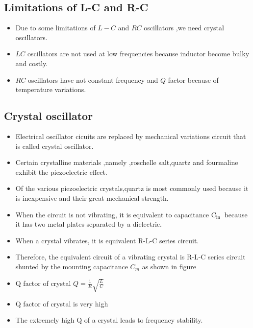 \subsection{Limitations of L-C and R-C}
\begin{itemize}
	\item Due to some limitations of $L-C$ and $RC$ oscillators ,we need crystal oscillators.
	\item $LC$ oscillators are not used at low frequencies because inductor become bulky and costly.
	\item $RC$ oscillators have not constant frequency and $Q$ factor because of temperature variations.
\end{itemize}
\subsection{Crystal oscillator}
\begin{itemize}
	\item Electrical oscillator cicuits are replaced by mechanical variations circuit that is called crystal oscillator.
	\item Certain crystalline materials ,namely ,roschelle salt,quartz and fourmaline exhibit the piezoelectric effect.
	\item Of the various piezoelectric crystals,quartz is most commonly used because it is inexpensive and their great mechanical strength.\\
		\item When the circuit is not vibrating, it is equivalent to capacitance $\mathrm{C}_{\text {in }}$ because it has two metal plates separated by a dielectric.
	\item When a crystal vibrates, it is equivalent R-L-C series circuit.
	\item Therefore, the equivalent circuit of a vibrating crystal is R-L-C series circuit shunted by the mounting capacitance $C_{m}$ as shown in figure 
	\item Q factor of crystal $Q=\frac{1}{R} \sqrt{\frac{L}{C}}$
	\item Q factor of crystal is very high
\item The extremely high $\mathrm{Q}$ of a crystal leads to frequency stability.
\end{itemize}
